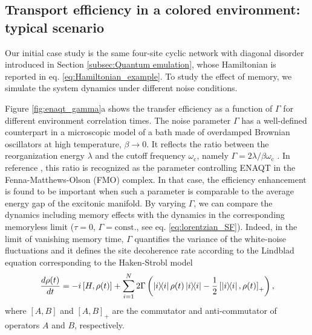 \documentclass[12pt, amsmath, amssymb, graphicx]{iopart}
\begin{document}
\subsection{\label{subsec:Effects of memory time on transport efficiency}Transport efficiency in a colored environment: typical scenario}

Our initial case study is the same four-site cyclic network with diagonal disorder introduced in Section \ref{subsec:Quantum emulation}, whose Hamiltonian is reported in eq. \ref{eq:Hamiltonian_example}.
To study the effect of memory, we simulate the system dynamics under different noise conditions.

Figure \ref{fig:enaqt_gamma}a shows the transfer efficiency as a function of $\Gamma$ for different environment correlation times.
The noise parameter $\Gamma$ has a well-defined counterpart in a microscopic model of a bath made of overdamped Brownian oscillators at high temperature, $\beta \to 0$.
It reflects the ratio between the reorganization energy $\lambda$ and the cutoff frequency $\omega_\text{c}$, namely $\Gamma = 2 \lambda / \beta \omega_\text{c}$ \cite{Gallina2023, Bondarenko2020}.
In reference \cite{Mohseni2014}, this ratio is recognized as the parameter controlling ENAQT in the Fenna-Matthews-Olson (FMO) complex. In that case, the efficiency enhancement is found to be important when such a parameter is comparable to the average energy gap of the excitonic manifold.
By varying $\Gamma$, we can compare the dynamics including memory effects with the dynamics in the corresponding memoryless limit ($\tau = 0$, $\Gamma = \text{const.}$, see eq. \ref{eq:lorentzian_SF}).
Indeed, in the limit of vanishing memory time, $\Gamma$ quantifies the variance of the white-noise fluctuations and it defines the site decoherence rate according to the Lindblad equation corresponding to the Haken-Strobl model \cite{Gallina2022}
%
\begin{equation} \label{eq:Lindblad}
    \frac{d\rho(t)}{dt} =
    -i \left[ H, \rho(t) \right] +
    \sum_{i=1}^N 2 \Gamma \left( \ketbra{i} \rho(t) \ketbra{i} - \frac{1}{2} \left[ \ketbra{i}, \rho(t) \right]_+ \right),
\end{equation}
%
where $\left[ A, B \right]$ and $\left[ A, B \right]_+$ are the commutator and anti-commutator of operators $A$ and $B$, respectively.
\end{document}

